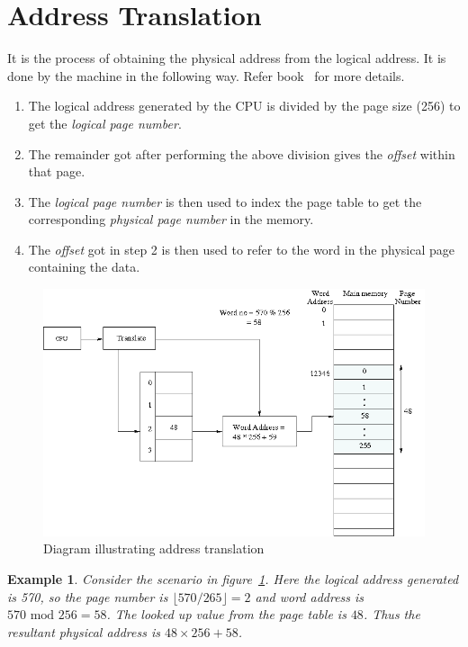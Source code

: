\documentclass[11pt]{report}
\newtheorem{example}{Example}[section]
\begin{document}
\section{Address Translation} 
It is the process of obtaining the physical address from the logical address. It is done by the machine in the following way. Refer book~\cite{Bach} for more details.

\begin{enumerate}
	\item The logical address generated by the CPU is divided by the page size (256) to get the \emph{logical page number}.
	\item The remainder got after performing the above division gives the \emph{offset} within that page.
	\item The \emph{logical page number} is then used to index the page table to get the corresponding \emph{physical page number} in the memory.
	\item The \emph{offset} got in step 2 is then used to refer to the word in the physical page containing the data.\\
\end{enumerate}

\begin{figure}[h!]
	\centering
	\includegraphics[scale=0.55]{pics/paging_example}
	\caption{Diagram illustrating address translation}
	\label{fig:paging_example}
\end{figure}

\begin{example}
	Consider the scenario in figure~\ref{fig:paging_example}. Here the logical address generated is 570, so the page number is $ \lfloor 570/265 \rfloor = 2$ and word address is $570\mbox{ mod }256 = 58$. The looked up value from the page table is $48$. Thus the resultant physical address is $48 \times 256+58$.
\end{example}
	
\end{document}
